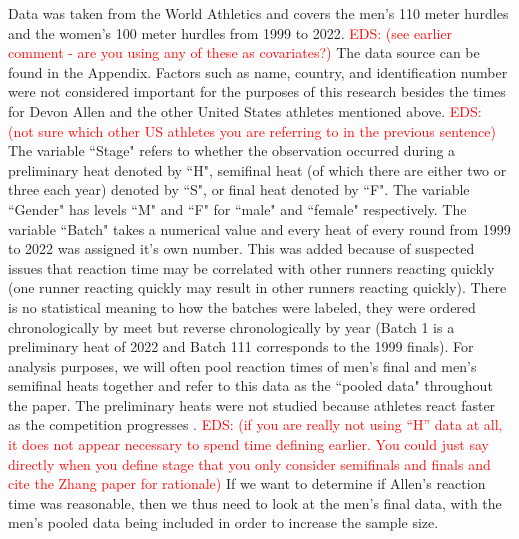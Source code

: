 \documentclass[12pt, letterpaper, titlepage]{article}
\newcommand{\eds}[1]{\textcolor{red}{EDS: (#1)}}
\begin{document}
Data was taken from the World Athletics 
and covers the men's 110 meter hurdles 
and the women's 100 meter hurdles from 1999 to 2022.  \eds{see earlier comment - 
are you using any of these as covariates?}
The data source can be found in the Appendix.%
Factors such as name, 
country, and identification number were not considered important for the 
purposes of this research besides the times for Devon Allen and the other 
United States athletes mentioned above. \eds{not sure which other US athletes 
you are referring to in the previous sentence} 
The variable ``Stage" refers to whether the observation occurred during a 
preliminary heat denoted by ``H", semifinal heat (of which there are either two
or three each year) denoted by ``S", or final heat denoted by ``F". The variable 
``Gender" has levels ``M" and ``F" for ``male" and ``female" respectively.  The
variable ``Batch" takes a 
numerical value and every heat of every round from 1999 to 2022 was assigned it's
own number.  This was added because of suspected issues that reaction time may be
correlated with other runners reacting quickly (one runner reacting quickly may
result in other runners reacting quickly). There is no statistical meaning to
how the batches were labeled, they were ordered chronologically by meet but
reverse chronologically by year (Batch 1 is a preliminary heat of 2022 and Batch
111 corresponds to the 1999 finals). %
For analysis purposes, we will often pool reaction times of men's final and 
men's semifinal heats together and refer to this data as the ``pooled data"
throughout the paper.  %
The preliminary heats were not studied because athletes react faster as the 
competition progresses \citep[e.g.,][]{zhang2021correlation}. %
\eds{if you are really not using ``H'' data at all, it does not appear necessary
to spend time defining earlier.  You could just say directly when you define 
stage that you only consider semifinals and finals and cite the Zhang paper for 
rationale}
If we want to determine if Allen's reaction time
was reasonable, then we thus need to look at the men's final data, with the men's
pooled data being included in order to increase the sample size.  
\end{document}
